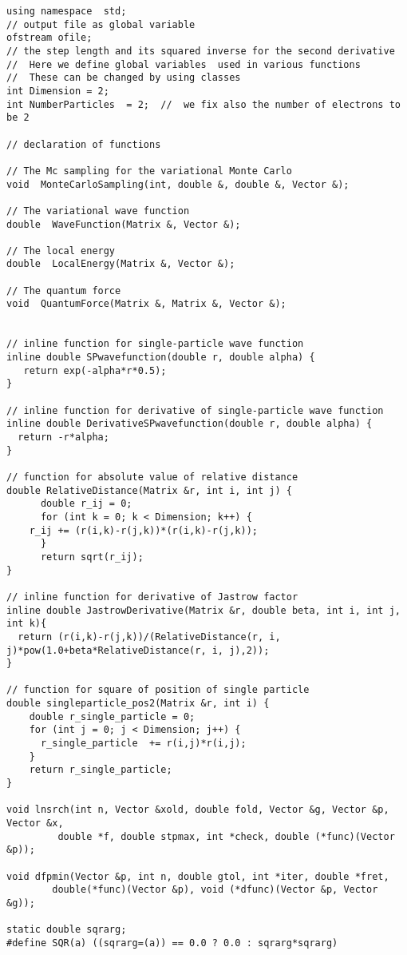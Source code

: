 \documentclass{beamer}
\begin{document}
\begin{frame}
\begin{block}{}
\begin{verbatim}
using namespace  std;
// output file as global variable
ofstream ofile;  
// the step length and its squared inverse for the second derivative 
//  Here we define global variables  used in various functions
//  These can be changed by using classes
int Dimension = 2; 
int NumberParticles  = 2;  //  we fix also the number of electrons to be 2

// declaration of functions 

// The Mc sampling for the variational Monte Carlo 
void  MonteCarloSampling(int, double &, double &, Vector &);

// The variational wave function
double  WaveFunction(Matrix &, Vector &);

// The local energy 
double  LocalEnergy(Matrix &, Vector &);

// The quantum force
void  QuantumForce(Matrix &, Matrix &, Vector &);


// inline function for single-particle wave function
inline double SPwavefunction(double r, double alpha) { 
   return exp(-alpha*r*0.5);
}

// inline function for derivative of single-particle wave function
inline double DerivativeSPwavefunction(double r, double alpha) { 
  return -r*alpha;
}

// function for absolute value of relative distance
double RelativeDistance(Matrix &r, int i, int j) { 
      double r_ij = 0;  
      for (int k = 0; k < Dimension; k++) { 
	r_ij += (r(i,k)-r(j,k))*(r(i,k)-r(j,k));
      }
      return sqrt(r_ij); 
}

// inline function for derivative of Jastrow factor
inline double JastrowDerivative(Matrix &r, double beta, int i, int j, int k){
  return (r(i,k)-r(j,k))/(RelativeDistance(r, i, j)*pow(1.0+beta*RelativeDistance(r, i, j),2));
}

// function for square of position of single particle
double singleparticle_pos2(Matrix &r, int i) { 
    double r_single_particle = 0;
    for (int j = 0; j < Dimension; j++) { 
      r_single_particle  += r(i,j)*r(i,j);
    }
    return r_single_particle;
}

void lnsrch(int n, Vector &xold, double fold, Vector &g, Vector &p, Vector &x,
		 double *f, double stpmax, int *check, double (*func)(Vector &p));

void dfpmin(Vector &p, int n, double gtol, int *iter, double *fret,
	    double(*func)(Vector &p), void (*dfunc)(Vector &p, Vector &g));

static double sqrarg;
#define SQR(a) ((sqrarg=(a)) == 0.0 ? 0.0 : sqrarg*sqrarg)



\end{verbatim}
\end{block}
\end{frame}
\end{document}
